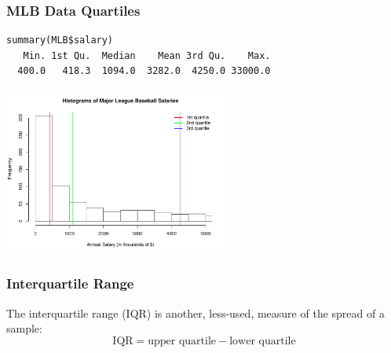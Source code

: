 \documentclass[handout]{beamer}
\newcommand{\blue}[1]{\textcolor{blue2}{#1}}
\begin{document}
\begin{frame}[fragile]
\frametitle{MLB Data Quartiles}

\begin{verbatim}
summary(MLB$salary)
   Min. 1st Qu.  Median    Mean 3rd Qu.    Max.
  400.0   418.3  1094.0  3282.0  4250.0 33000.0
\end{verbatim}

\begin{center}
\includegraphics[height=5.5cm]{figure/MLB_quartiles2.pdf}
\end{center}

\end{frame}



\begin{frame}
\frametitle{Interquartile Range}
The \blue{interquartile range (IQR)} is another, less-used, measure of the spread of a sample:
\pause\[
\mbox{IQR} = \mbox{upper quartile} - \mbox{lower quartile}
\]

\end{frame}
\end{document}
